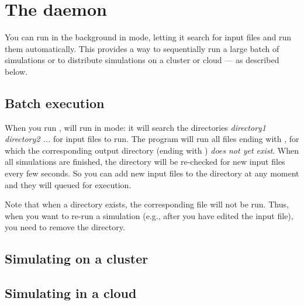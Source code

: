 \section{The \prog daemon}

You can run \prog in the background in  mode, letting it search for input files and run them automatically. This provides a way to sequentially run a large batch of simulations or to distribute simulations on a cluster or cloud --- as described below.


\subsection{Batch execution}

When you run \prog {}   , \prog will run in  mode: it will search the directories \emph{directory1 directory2 ...} for input files to run. The program will run all files ending with , for which the corresponding output directory (ending with ) \emph{does not yet exist}.  When all simulations are finished, the directory will be re-checked for new input files every few seconds. So you can add new input files to the directory at any moment and they will queued for execution.

Note that when a directory  exists, the corresponding  file will not be run. Thus, when you want to re-run a simulation (e.g., after you have edited the input file), you need to remove the 
 directory.

\subsection{Simulating on a cluster}

\subsection{Simulating in a cloud}
